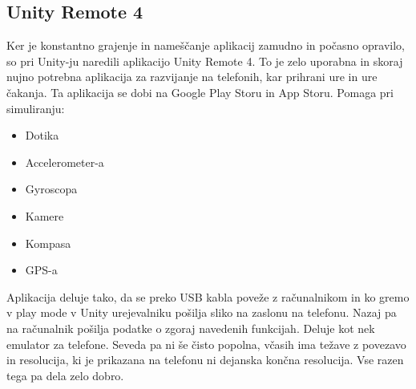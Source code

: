 {\color{indiagreen}\subsection{Unity Remote 4}}
Ker je konstantno grajenje in nameščanje aplikacij zamudno in počasno opravilo, so pri Unity-ju naredili aplikacijo Unity Remote 4. To je zelo uporabna in skoraj nujno potrebna aplikacija za razvijanje na telefonih, kar prihrani ure in ure čakanja. Ta aplikacija se dobi na Google Play Storu in App Storu. Pomaga pri simuliranju:
\begin{itemize}
	\item Dotika
	\item Accelerometer-a
	\item Gyroscopa
	\item Kamere
	\item Kompasa
	\item GPS-a
\end{itemize}
Aplikacija deluje tako, da se preko USB kabla poveže z računalnikom in ko gremo v play mode v Unity urejevalniku pošilja sliko na zaslonu na telefonu. Nazaj pa na računalnik pošilja podatke o zgoraj navedenih funkcijah. Deluje kot nek emulator za telefone. Seveda pa ni še čisto popolna, včasih ima težave z povezavo in resolucija, ki je prikazana na telefonu ni dejanska končna resolucija. Vse razen tega pa dela zelo dobro.